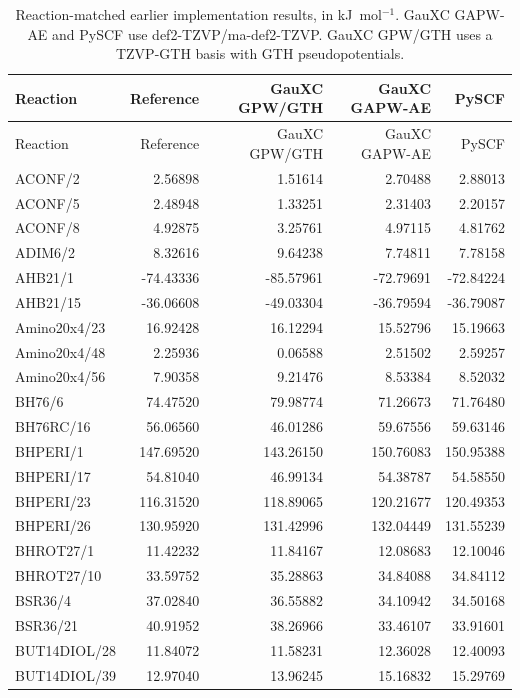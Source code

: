 \documentclass[10pt,a4paper]{article}
\begin{document}
{\small
\begin{longtable}{@{}lrrrr@{}}
\caption{Reaction-matched earlier implementation results, in kJ~mol$^{-1}$. GauXC GAPW-AE and PySCF use def2-TZVP/ma-def2-TZVP. GauXC GPW/GTH uses a TZVP-GTH basis with GTH pseudopotentials.}\label{tab:common62-external}\\
\toprule
Reaction & Reference & GauXC GPW/GTH & GauXC GAPW-AE & PySCF \\
\midrule
\endfirsthead
\toprule
Reaction & Reference & GauXC GPW/GTH & GauXC GAPW-AE & PySCF \\
\midrule
\endhead
ACONF/2 & 2.56898 & 1.51614 & 2.70488 & 2.88013 \\
ACONF/5 & 2.48948 & 1.33251 & 2.31403 & 2.20157 \\
ACONF/8 & 4.92875 & 3.25761 & 4.97115 & 4.81762 \\
ADIM6/2 & 8.32616 & 9.64238 & 7.74811 & 7.78158 \\
AHB21/1 & -74.43336 & -85.57961 & -72.79691 & -72.84224 \\
AHB21/15 & -36.06608 & -49.03304 & -36.79594 & -36.79087 \\
Amino20x4/23 & 16.92428 & 16.12294 & 15.52796 & 15.19663 \\
Amino20x4/48 & 2.25936 & 0.06588 & 2.51502 & 2.59257 \\
Amino20x4/56 & 7.90358 & 9.21476 & 8.53384 & 8.52032 \\
BH76/6 & 74.47520 & 79.98774 & 71.26673 & 71.76480 \\
BH76RC/16 & 56.06560 & 46.01286 & 59.67556 & 59.63146 \\
BHPERI/1 & 147.69520 & 143.26150 & 150.76083 & 150.95388 \\
BHPERI/17 & 54.81040 & 46.99134 & 54.38787 & 54.58550 \\
BHPERI/23 & 116.31520 & 118.89065 & 120.21677 & 120.49353 \\
BHPERI/26 & 130.95920 & 131.42996 & 132.04449 & 131.55239 \\
BHROT27/1 & 11.42232 & 11.84167 & 12.08683 & 12.10046 \\
BHROT27/10 & 33.59752 & 35.28863 & 34.84088 & 34.84112 \\
BSR36/4 & 37.02840 & 36.55882 & 34.10942 & 34.50168 \\
BSR36/21 & 40.91952 & 38.26966 & 33.46107 & 33.91601 \\
BUT14DIOL/28 & 11.84072 & 11.58231 & 12.36028 & 12.40093 \\
BUT14DIOL/39 & 12.97040 & 13.96245 & 15.16832 & 15.29769 \\

\end{longtable}}
\end{document}
